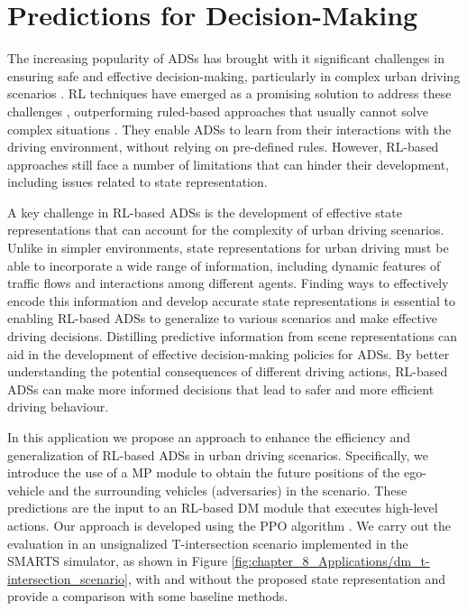 \section{Predictions for Decision-Making}
\label{sec:8_decision_making}


The increasing popularity of \acp{ADS} has brought with it significant challenges in ensuring safe and effective decision-making, particularly in complex urban driving scenarios \cite{Yurtsever2019}. \ac{RL} techniques have emerged as a promising solution to address these challenges \cite{Ravi2020}, outperforming ruled-based approaches that usually cannot solve complex situations \cite{Zhu2019}. They enable \acp{ADS} to learn from their interactions with the driving environment, without relying on pre-defined rules. However, \ac{RL}-based approaches still face a number of limitations that can hinder their development, including issues related to state representation. %

A key challenge in \ac{RL}-based \acp{ADS} is the development of effective state representations that can account for the complexity of urban driving scenarios. Unlike in simpler environments, state representations for urban driving must be able to incorporate a wide range of information, including dynamic features of traffic flows and interactions among different agents. Finding ways to effectively encode this information and develop accurate state representations is essential to enabling \ac{RL}-based \acp{ADS} to generalize to various scenarios and make effective driving decisions. Distilling predictive information from scene representations can aid in the development of effective decision-making policies for \acp{ADS}. By better understanding the potential consequences of different driving actions, \ac{RL}-based \acp{ADS} can make more informed decisions that lead to safer and more efficient driving behaviour.

In this application we propose an approach to enhance the efficiency and generalization of \ac{RL}-based \acp{ADS} in urban driving scenarios. Specifically, we introduce the use of a \ac{MP} module to obtain the future positions of the ego-vehicle and the surrounding vehicles (adversaries) in the scenario. These predictions are the input to an \ac{RL}-based \ac{DM} module that executes high-level actions. Our approach is developed using the \ac{PPO} algorithm  \cite{Schulman2017}.  We carry out the evaluation in an unsignalized T-intersection scenario implemented in the \ac{SMARTS} simulator, as shown in Figure \ref{fig:chapter_8_Applications/dm_t-intersection_scenario}, with and without the proposed state representation and provide a comparison with some baseline methods.

